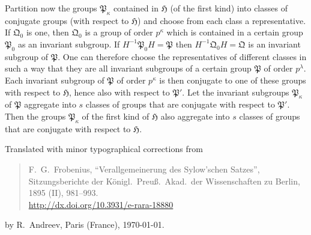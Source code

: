 \documentclass[a5paper,12pt]{article}
\let\fr\mathfrak
\newcommand{\CH}{\fr{H}}
\newcommand{\CP}{\fr{P}}
\newcommand{\CQ}{\fr{Q}}
\newcommand{\?}{{\color{blue}${}^{(?)}$}}
\begin{document}

Partition now
the groups $\CP_\kappa$
contained in $\CH$
(of the first kind)
into classes 
of conjugate groups 
(with respect to $\CH$)
and
choose 
from each class a representative.
%
%
If $\CQ_0$ is one,
then $\CQ_0$ is a group of order $p^\kappa$
which
is contained in a certain group $\CP_0$
as an invariant subgroup.
%
%
If $H^{-1} \CP_0 H = \CP$
then $H^{-1} \CQ_0 H = \CQ$
is an invariant subgroup of $\CP$.
%
%
One can therefore
choose the representatives
of different classes
in such a way
that
they are all invariant subgroups 
of a certain group $\CP$ of order $p^\lambda$.
%
%
Each invariant subgroup of $\CP$ 
of order $p^\kappa$
is then conjugate
to one of these groups
with respect to $\CH$,
hence also 
with respect to $\CP'$.
%
%
Let
the invariant subgroups $\CP_\kappa$ of $\CP$
aggregate
into $s$ classes of groups
that are conjugate 
with respect to $\CP'$.
%
%
Then the groups $\CP_\kappa$ 
of the first kind
of $\CH$
also
aggregate
into $s$ classes of groups
that are conjugate
with respect to $\CH$.



\vfill

\noindent
\begin{minipage}{\textwidth}
{\footnotesize

\noindent
Translated with minor typographical corrections from
\begin{quote}
	F.~G.~Frobenius,
	``Verallgemeinerung des Sylow'schen Satzes'',
	Sitzungsberichte der 
	K\"onigl.~Preu\ss.~Akad.~der Wissenschaften
	zu Berlin,
	1895 (II),
	981--993.
	\\
	\href{http://dx.doi.org/10.3931/e-rara-18880}{http://dx.doi.org/10.3931/e-rara-18880}
\end{quote}
by
R.~Andreev,
Paris (France),
\today.
}
\end{minipage}




\end{document}
